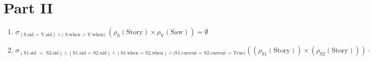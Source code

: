 \documentclass[letter, 9pt]{article}
\begin{document}
\section*{Part II}
\begin{enumerate}
    \item $\sigma_{(\text{S.sid = V.sid}) \land (\text{S.when $>$ V.when)}} (\rho_{\text{S}} (\text{Story}) \times \rho_{\text{V}} (\text{Saw})) = \emptyset $
    
    \item $\sigma_{(\text{S1.sid $<$ S2.sid}) \land (\text{S1.uid = S2.uid}) \land (\text{S1.when = S2.when}) \land (\text{S1.current = S2.current = True)}} ((\rho_{\text{S1}} (\text{Story})) \times (\rho_{\text{S2}} (\text{Story}))) = \emptyset$

\end{enumerate}
\end{document}
